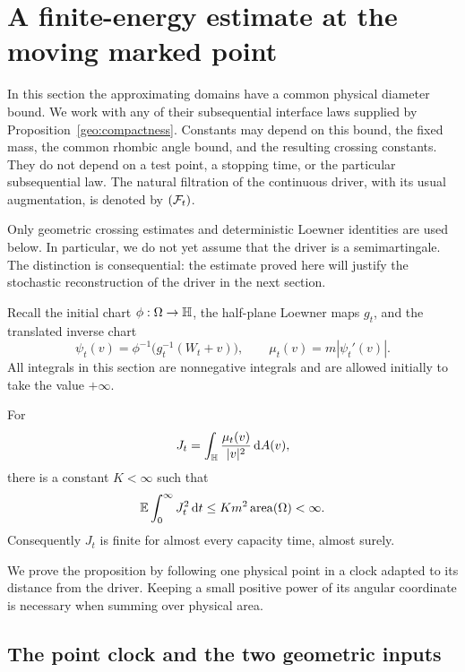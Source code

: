 \section{A finite-energy estimate at the moving marked point}
\label{eng:section}

In this section the approximating domains have a common physical diameter
bound.  We work with any of their subsequential interface laws supplied by
Proposition~\ref{geo:compactness}.  Constants may depend on this bound,
the fixed mass, the common rhombic angle bound, and the resulting crossing
constants.  They do not depend on a test point, a stopping time, or the
particular subsequential law.  The natural filtration of the continuous
driver, with its usual augmentation, is denoted by $(\mathcal F_t)$.

Only geometric crossing estimates and deterministic Loewner identities
are used below.  In particular, we do not yet assume that the driver is a
semimartingale.  The distinction is consequential: the estimate proved
here will justify the stochastic reconstruction of the driver in the next
section.

Recall the initial chart $\phi:\Omega\to\mathbb H$, the half-plane Loewner maps
$g_t$, and the translated inverse chart
\[
 \psi_t(v)=\phi^{-1}\bigl(g_t^{-1}(W_t+v)\bigr),
 \qquad \mu_t(v)=m|\psi_t'(v)|.
\]
All integrals in this section are nonnegative integrals and are allowed
initially to take the value $+\infty$.

\begin{proposition}\label{eng:energy}
For
\begin{equation}\label{eng:J-definition}
 J_t=\int_{\mathbb H}\frac{\mu_t(v)}{|v|^2}\,\mathrm d A(v),
\end{equation}
there is a constant $K<\infty$ such that
\begin{equation}\label{eng:energy-bound}
 \mathbb E\int_0^\infty J_t^2\,\mathrm d t
 \le K m^2\operatorname{area}(\Omega)<\infty.
\end{equation}
Consequently $J_t$ is finite for almost every capacity time, almost surely.
\end{proposition}

We prove the proposition by following one physical point in a clock
adapted to its distance from the driver.  Keeping a small positive power
of its angular coordinate is necessary when summing over physical area.

\subsection{The point clock and the two geometric inputs}

